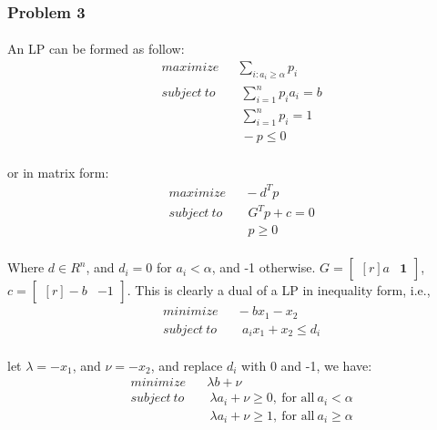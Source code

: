 \subsubsection*{Problem 3}
\paragraph{}
An LP can be formed as follow:
\begin{align*}
& maximize \quad \ \  \sum_{i:a_i \geq \alpha} p_i\\
& subject \ to \qquad \sum_{i = 1}^n p_i a_i = b\\
&\qquad \qquad \qquad \ \sum_{i = 1}^n p_i = 1\\
&\qquad \qquad \qquad \ -p \leq 0
\end{align*}
\paragraph{}
or in matrix form:
\begin{align*}
& maximize \quad \ \ -d^T p\\
& subject \ to \qquad G^T p + c = 0\\
&\qquad \qquad \qquad \ p \geq 0
\end{align*}
\paragraph{}
Where $d \in R^n$, and $d_i = 0$ for $a_i < \alpha$, and -1 otherwise. 
$G = \begin{bmatrix*}[r]
a&\textbf{1}
\end{bmatrix*}$,  
$c = \begin{bmatrix*}[r]
-b&-1
\end{bmatrix*}$. This is clearly a dual of a LP in inequality form, i.e.,
\begin{align*}
& minimize \quad \ \ -bx_1 - x_2\\
& subject \ to \qquad a_i x_1 + x_ 2 \leq d_i
\end{align*}
\paragraph{}
let $\lambda = -x_1$, and $\nu = -x_2$, and replace $d_i$ with 0 and -1, we have:
\begin{align*}
& minimize \quad \ \ \  \lambda b +\nu\\
& subject \ to \qquad \lambda a_i + \nu \geq 0,\ \text{for all}\ a_i < \alpha\\
& \qquad \qquad \qquad  \ \lambda a_i + \nu \geq 1,\ \text{for all}\  a_i \geq \alpha \\
\end{align*}
